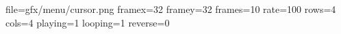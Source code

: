 file=gfx/menu/cursor.png
framex=32
framey=32
frames=10
rate=100
rows=4
cols=4
playing=1
looping=1
reverse=0